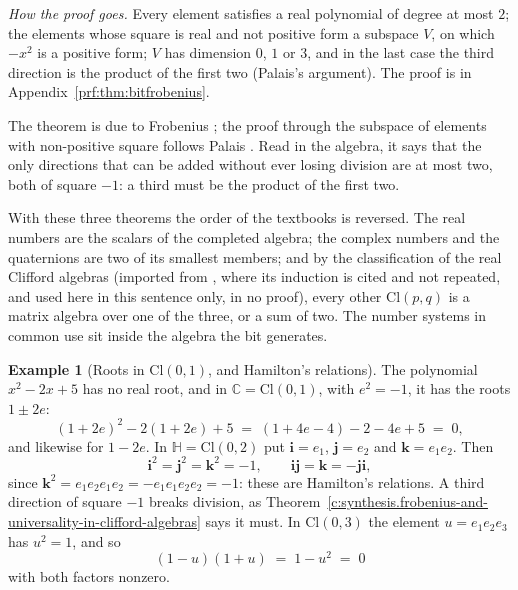 \documentclass[11pt]{article}
\theoremstyle{definition}
\newtheorem{example}[theorem]{Example}
\theoremstyle{plain}
\newcommand{\changedmark}[2]{\marginpar{\raggedright\scriptsize\color{#1}#2}}
\providecommand{\C}{}\renewcommand{\C}{\mathbb{C}}
\providecommand{\Cl}{}\renewcommand{\Cl}{\mathrm{Cl}}
\providecommand{\HH}{}\renewcommand{\HH}{\mathbb{H}}
\begin{document}
\label{c:note.geometry-first.setting-completion-number-systems-inside-5}
\noindent\emph{How the proof goes.} Every element satisfies a real polynomial of degree at most $2$; the elements whose square is real and not positive form a subspace $V$, on which $-x^{2}$ is a positive form; $V$ has dimension $0$, $1$ or $3$, and in the last case the third direction is the product of the first two (Palais's argument). The proof is in Appendix~\ref{prf:thm:bitfrobenius}.

The theorem is due to Frobenius \cite{Frobenius1878}; the proof through the subspace of elements with non-positive square follows Palais \cite{Palais1968}. Read in the algebra, it says that the only directions that can be added without ever losing division are at most two, both of square $-1$: a third must be the product of the first two.

With these three theorems the order of the textbooks is reversed. The real numbers are the scalars of the completed algebra; the complex numbers and the quaternions are two of its smallest members; and by the classification of the real Clifford algebras (imported from \cite[Theorem 9.3]{ButlerT0}, where its induction is cited and not repeated, and used here in this sentence only, in no proof), every other $\Cl(p,q)$ is a matrix algebra over one of the three, or a sum of two. The number systems in common use sit inside the algebra the bit generates.

\begin{example}[Roots in $\Cl(0,1)$, and Hamilton's relations]\label{c:note.geometry-first.roots-cl-0-1-hamiltons-relations}
\changedmark{BurntOrange}{changed since the deposit}
The polynomial $x^{2} - 2x + 5$ has no real root, and in $\C = \Cl(0,1)$, with $e^{2} = -1$, it has the roots $1 \pm 2e$:
\[
(1 + 2e)^{2} - 2(1 + 2e) + 5 \;=\; (1 + 4e - 4) - 2 - 4e + 5 \;=\; 0 ,
\]
and likewise for $1 - 2e$. In $\HH = \Cl(0,2)$ put $\mathbf{i} = e_{1}$, $\mathbf{j} = e_{2}$ and $\mathbf{k} = e_{1}e_{2}$. Then
\[
\mathbf{i}^{2} = \mathbf{j}^{2} = \mathbf{k}^{2} = -1, \qquad \mathbf{i}\mathbf{j} = \mathbf{k} = -\mathbf{j}\mathbf{i} ,
\]
since $\mathbf{k}^{2} = e_{1}e_{2}e_{1}e_{2} = -e_{1}e_{1}e_{2}e_{2} = -1$: these are Hamilton's relations. A third direction of square $-1$ breaks division, as Theorem~\ref{c:synthesis.frobenius-and-universality-in-clifford-algebras} says it must. In $\Cl(0,3)$ the element $u = e_{1}e_{2}e_{3}$ has $u^{2} = 1$, and so
\[
(1 - u)(1 + u) \;=\; 1 - u^{2} \;=\; 0
\]
with both factors nonzero.
\end{example}
\end{document}
